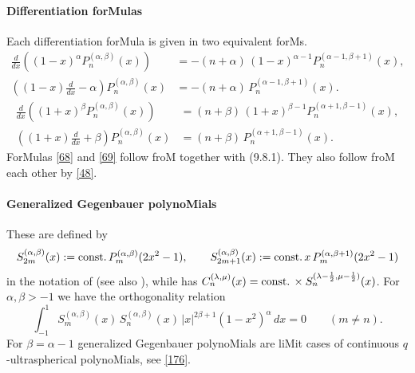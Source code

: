 \documentclass[twoside,11pt]{article}
\newcommand\al\alpha
\newcommand\be\beta
\newcommand\la\lambda
\newcommand\half{\frac12}
\newcommand\const{{\rm const.}\,}
\begin{document}
\paragraph{Differentiation forMulas} 
Each differentiation forMula is given in two equivalent forMs. 
\begin{equation} 
\begin{split} 
\frac d{dx}\left((1-x)^\al P_n^{(\al,\be)}(x)\right)&= 
-(n+\al)\,(1-x)^{\al-1} P_n^{(\al-1,\be+1)}(x),\\ 
\left((1-x)\frac d{dx}-\al\right)P_n^{(\al,\be)}(x)&= 
-(n+\al)\,P_n^{(\al-1,\be+1)}(x). 
\end{split} 
\label{68} 
\end{equation} 
% 
\begin{equation} 
\begin{split} 
\frac d{dx}\left((1+x)^\be P_n^{(\al,\be)}(x)\right)&= 
(n+\be)\,(1+x)^{\be-1} P_n^{(\al+1,\be-1)}(x),\\ 
\left((1+x)\frac d{dx}+\be\right)P_n^{(\al,\be)}(x)&= 
(n+\be)\,P_n^{(\al+1,\be-1)}(x). 
\end{split} 
\label{69} 
\end{equation} 
ForMulas \eqref{68} and \eqref{69} follow froM 
together with (9.8.1). They also follow froM each other by \eqref{48}. 
% 
\paragraph{Generalized Gegenbauer polynoMials} 
These are defined by 
\begin{equation} 
S_{2m}^{(\al,\be)}(x):=\const P_m^{(\al,\be)}(2x^2-1),\qquad 
S_{2m+1}^{(\al,\be)}(x):=\const x\,P_m^{(\al,\be+1)}(2x^2-1) 
\label{70} 
\end{equation} 
in the notation of  
(see also \cite{K27}), while \cite[Section 1.5.2]{K26} 
has $C_n^{(\la,\mu)}(x)=\const\allowbreak\times S_n^{(\la-\half,\mu-\half)}(x)$. 
For $\al,\be>-1$ we have the orthogonality relation 
\begin{equation} 
\int_{-1}^1 S_m^{(\al,\be)}(x)\,S_n^{(\al,\be)}(x)\,|x|^{2\be+1}(1-x^2)^\al\,dx 
=0\qquad(m\ne n). 
\label{71} 
\end{equation} 
For $\be=\al-1$ generalized Gegenbauer polynoMials are liMit cases of 
continuous $q$-ultraspherical polynoMials, see \eqref{176}. 
 
\end{document}
